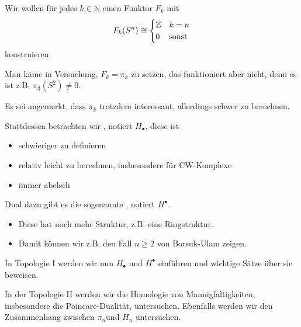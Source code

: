  \begin{goal}
     Wir wollen für jedes $k\in \mathbb{N}$ einen Funktor $F_k$ mit 
     \[
         F_k(S^n) \cong \begin{cases}
             \mathbb{Z} & k = n \\
             0 & \text{sonst}
         \end{cases}
     \]
     konstruieren.
\end{goal}

\begin{warning}
    Man käme in Versuchung, $F_k = \pi_k$ zu setzen, das funktioniert aber nicht, denn es ist z.B. $\pi_3(S^2) \neq  0$.
\end{warning}

Es sei angemerkt, dass $\pi_k$ trotzdem interessant, allerdings  schwer zu berechnen.

Stattdessen betrachten wir , notiert $H_{\bullet}$, diese ist
\begin{itemize}
    \item schwieriger zu definieren
    \item relativ leicht zu berechnen, insbesondere für CW-Komplexe
    \item immer abelsch
\end{itemize}
Dual dazu gibt es die sogenannte , notiert $H^{\bullet}$.
\begin{itemize}
    \item Diese hat noch mehr Struktur, z.B. eine Ringstruktur.
    \item Damit können wir z.B. den Fall $n\geq 2$ von Borsuk-Ulam zeigen.
\end{itemize}

In Topologie I werden wir nun $H_{\bullet}$ und $H^{\bullet}$ einführen und wichtige Sätze über sie beweisen.

In der Topologie II  werden wir die Homologie von Mannigfaltigkeiten, insbesondere die Poincare-Dualität, untersuchen. Ebenfalls werden wir den Zusammenhang zwischen $\pi_n$und $H_n$ untersuchen.
